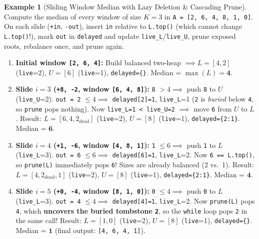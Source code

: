 \documentclass[11pt,a4paper]{article}
\theoremstyle{definition}
\newtheorem{example}{Example}[section]
\begin{document}
\begin{example}[Sliding Window Median with Lazy Deletion \& Cascading Prune]
Compute the median of every window of size $K = 3$ in \texttt{A = [2, 6, 4, 8, 1, 0]}. On each slide (\texttt{+in}, \texttt{-out}), insert \texttt{in} relative to \texttt{L.top()} (which cannot change \texttt{L.top()}!), mark \texttt{out} in \texttt{delayed} and update \texttt{live\_L}/\texttt{live\_U}, prune exposed roots, rebalance once, and prune again.

\begin{enumerate}[itemsep=1pt, topsep=2pt]
    \item \textbf{Initial window \texttt{[2, 6, 4]}:} Build balanced two-heap $\implies L = [4, 2]$ (\texttt{live}=2), $U = [6]$ (\texttt{live}=1), \texttt{delayed=\{\}}. Median = $\max(L) = \mathbf{4}$.
    \item \textbf{Slide $i = 3$ (\texttt{+8, -2}, window \texttt{[6, 4, 8]}):}
    \texttt{8} $> 4 \implies$ push \texttt{8} to $U$ (\texttt{live\_U}=2). \texttt{out = 2} $\le 4 \implies$ \texttt{delayed[2]=1}, \texttt{live\_L}=1 (\texttt{2} is \emph{buried} below \texttt{4}, so \texttt{prune} pops nothing). Now \texttt{live\_L=1 < live\_U=2} $\implies$ move \texttt{6} from $U$ to $L$. Result: $L = [6, 4, 2_{\text{dead}}]$ (\texttt{live}=2), $U = [8]$ (\texttt{live}=1), \texttt{delayed=\{2:1\}}. Median = $\mathbf{6}$.
    \item \textbf{Slide $i = 4$ (\texttt{+1, -6}, window \texttt{[4, 8, 1]}):}
    \texttt{1} $\le 6 \implies$ push \texttt{1} to $L$ (\texttt{live\_L}=3). \texttt{out = 6} $\le 6 \implies$ \texttt{delayed[6]=1}, \texttt{live\_L}=2. Now \texttt{6 == L.top()}, so \texttt{prune(L)} immediately pops \texttt{6}! Sizes are already balanced (2 vs.\ 1). Result: $L = [4, 2_{\text{dead}}, 1]$ (\texttt{live}=2), $U = [8]$ (\texttt{live}=1), \texttt{delayed=\{2:1\}}. Median = $\mathbf{4}$.
    \item \textbf{Slide $i = 5$ (\texttt{+0, -4}, window \texttt{[8, 1, 0]}):}
    \texttt{0} $\le 4 \implies$ push \texttt{0} to $L$ (\texttt{live\_L}=3). \texttt{out = 4} $\le 4 \implies$ \texttt{delayed[4]=1}, \texttt{live\_L}=2. Now \texttt{prune(L)} pops \texttt{4}, which \textbf{uncovers the buried tombstone \texttt{2}}, so the \texttt{while} loop pops \texttt{2} in the same call! Result: $L = [1, 0]$ (\texttt{live}=2), $U = [8]$ (\texttt{live}=1), \texttt{delayed=\{\}}. Median = $\mathbf{1}$ (final output: \texttt{[4, 6, 4, 1]}).
\end{enumerate}
\end{example}
\end{document}
